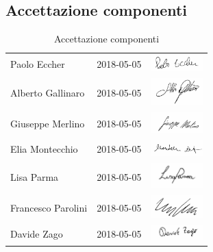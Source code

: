 	\subsection{Accettazione componenti}
		\begin{table}[H]
		\centering
		\begin{tabular}{|p{4cm}|C{4cm}|C{5cm}|}
			\hline
			 & & \\
			\hline			
			Paolo Eccher & 2018-05-05 & \includegraphics[width=2cm]{../../CommonImages/firme/paolo.png}  \\
			\hline
			Alberto Gallinaro & 2018-05-05 & \includegraphics[width=2cm]{../../CommonImages/firme/alberto.png} \\
			\hline
			Giuseppe Merlino & 2018-05-05 & \includegraphics[width=2cm]{../../CommonImages/firme/giuseppe.png} \\
			\hline
			Elia Montecchio & 2018-05-05 & \includegraphics[width=2cm]{../../CommonImages/firme/elia.png} \\
			\hline
			Lisa Parma & 2018-05-05 & \includegraphics[width=2cm]{../../CommonImages/firme/lisa.png} \\
			\hline
			Francesco Parolini & 2018-05-05 & \includegraphics[width=2cm]{../../CommonImages/firme/freppo.png} \\
			\hline
			Davide Zago & 2018-05-05 & \includegraphics[width=2cm]{../../CommonImages/firme/davide.png} \\
			\hline
		\end{tabular}
		\caption{Accettazione componenti}
	\end{table}

